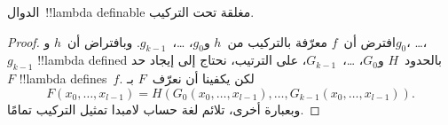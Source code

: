 \documentclass[../../../include/open-logic-section]{subfiles}
\begin{document}

\begin{lem}
الدوال~!!{lambda definable} مغلقة تحت التركيب.
\end{lem}

\begin{proof}
افترض أن~$f$ معرّفة بالتركيب من~$h$ و$g_0$، \dots،~$g_{k-1}$.
وبافتراض أن~$h$ و$g_0$، \dots،~$g_{k-1}$ !!{lambda defined}
بالحدود~$H$ و$G_0$، \dots،~$G_{k-1}$، على الترتيب، نحتاج إلى إيجاد
حد~$F$ !!{lambda define}s~$f$. لكن يكفينا أن نعرّف~$F$ بـ
\[
F(x_0, \dots, x_{l-1}) = H(G_0(x_0, \dots, x_{l-1}),
\dots, G_{k-1}(x_0, \dots, x_{l-1})).
\]
وبعبارة أخرى، تلائم لغة حساب لامبدا تمثيل التركيب تمامًا.
\end{proof}
\end{document}
